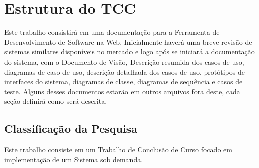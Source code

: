 \section{Estrutura do TCC}
Este trabalho consistirá em uma documentação para a Ferramenta de Desenvolvimento de Software na Web.
Inicialmente haverá uma breve revisão de sistemas similares disponíveis no mercado e logo após se iniciará a documentação do sistema, com o Documento de Visão, Descrição resumida dos casos de uso, diagramas de caso de uso, descrição detalhada dos casos de uso, protótipos de interfaces do sistema, diagramas de classe, diagramas de sequência e casos de teste.
Alguns desses documentos estarão em outros arquivos fora deste, cada seção definirá como será descrita.

\subsection{Classificação da Pesquisa}
Este trabalho consiste em um Trabalho de Conclusão de Curso focado em implementação de um Sistema sob demanda.
